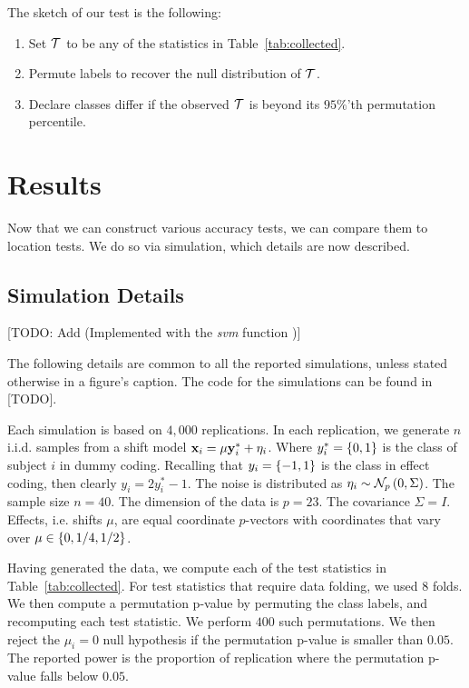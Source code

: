 \documentclass[12pt,a4paper]{article}
\begin{document}
The sketch of our test is the following:
\begin{enumerate}\itemsep0em 
	\item Set $\mathcal{T}$ to be any of the statistics in Table~\ref{tab:collected}.
	\item Permute labels to recover the null distribution of $\mathcal{T}$. 
	\item Declare classes differ if the observed $\mathcal{T}$ is beyond its $95\%$'th permutation percentile.  
\end{enumerate}





\section{Results}

Now that we can construct various accuracy tests, we can compare them to location tests. 
We do so via simulation, which details are now described.



\subsection{Simulation Details}
\label{apx:simulation_details}

[TODO: Add (Implemented with the \emph{svm} \R function \citep{meyer_e1071:_2015})]

The following details are common to all the reported simulations, unless stated otherwise in a figure's caption. 
The \R code for the simulations can be found in [TODO].

Each simulation is based on $4,000$ replications. 
In each replication, we generate $n$ i.i.d. samples from a shift model $\mathbf{x}_i = \mu \mathbf{y}^*_i + \eta_i$.
Where $y^*_i=\{ 0,1 \}$ is the class of subject $i$ in dummy coding. 
Recalling that $y_i=\{ -1,1 \}$ is the class in effect coding, then clearly $y_i=2 y^*_i-1$.
The noise is distributed as $\eta_i \sim \mathcal{N}_{p}\left(0,\Sigma\right)$. 
The sample size $n=40$. 
The dimension of the data is $p=23$. 
The covariance $\Sigma=I$. 
Effects, i.e. shifts $\mu$, are equal coordinate $p$-vectors with coordinates that vary over $\mu \in \{ 0,1/4,1/2 \}$.

Having generated the data, we compute each of the test statistics in Table~\ref{tab:collected}.
For test statistics that require data folding, we used $8$ folds. 
We then compute a permutation p-value by permuting the class labels, and recomputing each test statistic. 
We perform $400$ such permutations. 
We then reject the $\mu_i=0$ null hypothesis if the permutation p-value is smaller than $0.05$.
The reported power is the proportion of replication where the permutation p-value falls below $0.05$.
\end{document}
